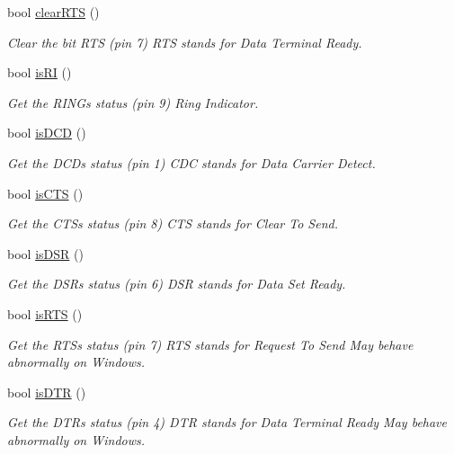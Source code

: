 \begin{DoxyCompactItemize}
bool \hyperlink{classserialib_ab0b5882339240002fccf7701f5321e0a}{clear\+R\+TS} ()
\begin{DoxyCompactList}\small\item\em Clear the bit R\+TS (pin 7) R\+TS stands for Data Terminal Ready. \end{DoxyCompactList}\item 
bool \hyperlink{classserialib_a605d8a8015fadb5db5521350aefe084e}{is\+RI} ()
\begin{DoxyCompactList}\small\item\em Get the R\+I\+NG\textquotesingle{}s status (pin 9) Ring Indicator. \end{DoxyCompactList}\item 
bool \hyperlink{classserialib_a5f451a5eea7c8c1bdcff684ba131d6ff}{is\+D\+CD} ()
\begin{DoxyCompactList}\small\item\em Get the D\+CD\textquotesingle{}s status (pin 1) C\+DC stands for Data Carrier Detect. \end{DoxyCompactList}\item 
bool \hyperlink{classserialib_aca544a6f8dfa33f8e771713646768215}{is\+C\+TS} ()
\begin{DoxyCompactList}\small\item\em Get the C\+TS\textquotesingle{}s status (pin 8) C\+TS stands for Clear To Send. \end{DoxyCompactList}\item 
bool \hyperlink{classserialib_a3f1f0894543dfb17955de50157965dd7}{is\+D\+SR} ()
\begin{DoxyCompactList}\small\item\em Get the D\+SR\textquotesingle{}s status (pin 6) D\+SR stands for Data Set Ready. \end{DoxyCompactList}\item 
bool \hyperlink{classserialib_ab2b121af07fb732f82668f6a14e93cfb}{is\+R\+TS} ()
\begin{DoxyCompactList}\small\item\em Get the R\+TS\textquotesingle{}s status (pin 7) R\+TS stands for Request To Send May behave abnormally on Windows. \end{DoxyCompactList}\item 
bool \hyperlink{classserialib_a4ec78286be81602bf1df44a4eb8372a8}{is\+D\+TR} ()
\begin{DoxyCompactList}\small\item\em Get the D\+TR\textquotesingle{}s status (pin 4) D\+TR stands for Data Terminal Ready May behave abnormally on Windows. \end{DoxyCompactList}\end{DoxyCompactItemize}


